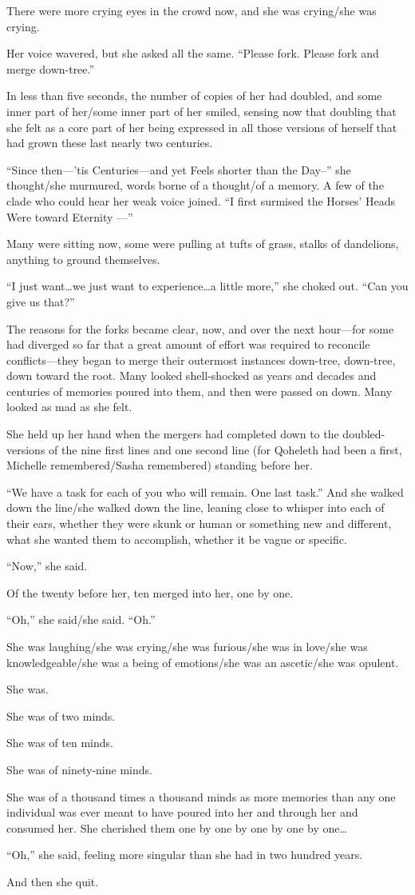 There were more crying eyes in the crowd now, and she was crying/she was crying.

Her voice wavered, but she asked all the same. ``Please fork. Please fork and merge down-tree.''

In less than five seconds, the number of copies of her had doubled, and some inner part of her/some inner part of her smiled, sensing now that doubling that she felt as a core part of her being expressed in all those versions of herself that had grown these last nearly two centuries.

``Since then---'tis Centuries---and yet Feels shorter than the Day--'' she thought/she murmured, words borne of a thought/of a memory. A few of the clade who could hear her weak voice joined. ``I first surmised the Horses' Heads Were toward Eternity —''

Many were sitting now, some were pulling at tufts of grass, stalks of dandelions, anything to ground themselves.

``I just want\ldots we just want to experience\ldots a little more,'' she choked out. ``Can you give us that?''

The reasons for the forks became clear, now, and over the next hour---for some had diverged so far that a great amount of effort was required to reconcile conflicts---they began to merge their outermost instances down-tree, down-tree, down toward the root. Many looked shell-shocked as years and decades and centuries of memories poured into them, and then were passed on down. Many looked as mad as she felt.

She held up her hand when the mergers had completed down to the doubled-versions of the nine first lines and one second line (for Qoheleth had been a first, Michelle remembered/Sasha remembered) standing before her.

``We have a task for each of you who will remain. One last task.'' And she walked down the line/she walked down the line, leaning close to whisper into each of their ears, whether they were skunk or human or something new and different, what she wanted them to accomplish, whether it be vague or specific.

``Now,'' she said.

Of the twenty before her, ten merged into her, one by one.

``Oh,'' she said/she said. ``Oh.''

She was laughing/she was crying/she was furious/she was in love/she was knowledgeable/she was a being of emotions/she was an ascetic/she was opulent.

She was.

She was of two minds.

She was of ten minds.

She was of ninety-nine minds.

She was of a thousand times a thousand minds as more memories than any one individual was ever meant to have poured into her and through her and consumed her. She cherished them one by one by one by one by one\ldots{}

``Oh,'' she said, feeling more singular than she had in two hundred years.

And then she quit.
